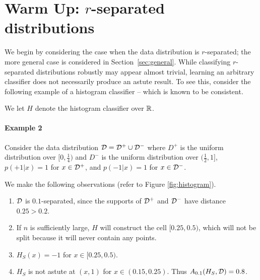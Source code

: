 \section{Warm Up: $r$-separated distributions}

We begin by considering the case when the data distribution is $r$-separated; the more general case is considered in Section~\ref{sec:general}. While classifying $r$-separated distributions robustly may appear almost trivial, learning an arbitrary classifier does not necessarily produce an astute result. To see this, consider the following example of a histogram classifier -- which is known to be consistent. 


We let $H$ denote the histogram classifier over $\mathbb R$.

\paragraph{Example 2}
Consider the data distribution ${\mathcal D} = {\mathcal D}^+ \cup {\mathcal D}^-$ where $D^+$ is the uniform distribution over $[0, \frac{1}{4})$ and $D^-$ is the uniform distribution over $(\frac{1}{2}, 1]$, $p(+1|x) = 1$ for $x \in {\mathcal D}^+$, and $p(-1|x) = 1$ for $x \in {\mathcal D}^-$. 

We make the following observations (refer to Figure \ref{fig:histogram}).
\begin{enumerate}
	\item ${\mathcal D}$ is $0.1$-separated, since the supports of ${\mathcal D}^+$ and ${\mathcal D}^-$ have distance $0.25 > 0.2$. 
	\item If $n$ is sufficiently large, $H$ will construct the cell $[0.25, 0.5)$, which will not be split because it will never contain any points. 
	\item $H_S(x) = -1$ for $x \in [0.25, 0.5)$.
	\item $H_S$ is not astute at $(x,1)$ for $x \in (0.15, 0.25)$. Thus $A_{0.1}(H_S, {\mathcal D}) = 0.8$.
\end{enumerate}

